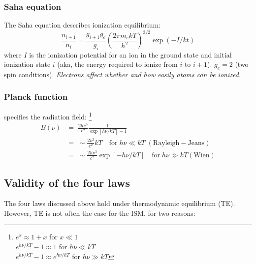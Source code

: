 \documentclass[11pt]{article}
\newcommand{\mar}[1]{\hspace{0pt}\marginpar{-\textcolor{black}{#1}-}}
\newcommand{\mynotes}[1]{{\fontfamily{cmss}\selectfont \textit{#1}}}
\begin{document}
\subsubsection{Saha equation}
The Saha equation describes ionization equilibrium:
\[
    \frac{n_{i+1}}{n_{i}} = \frac{g_{i+1}g_{e}}{g_{i}}
    \left( \frac{2\pi m_{e}kT}{h^{2}} \right) ^{3/2}
    \exp \left( -I/kt \right)
    \]
where $I$ is the ionization potential for an ion in the ground state
and initial ionization state $i$ (aka, the energy required to ionize
from $i$ to $i+1$). $g_{e} = 2$ (two spin conditions).
\mynotes{Electrons affect whether and how easily atoms can be ionized.}

\subsubsection{Planck function} specifies the radiation field:
\footnote{
    $e^{x} \approx 1 + x$ for $x \ll 1$\\
    $e^{h\nu/kT}-1 \approx 1$ for $h\nu \ll kT$\\
    $e^{h\nu/kT}-1 \approx e^{h\nu/kT}$ for $h\nu \gg kT$}
\begin{align*}
    B(\nu) &= \;\frac{2h\nu^{3}}{c^{2}}\frac{1}{\exp[h\nu/kT]-1}\\
    &= \;\sim \frac{2\nu^{2}}{c^{2}}kT\quad \mathrm{for}\;h\nu \ll kT\;
    (\mathrm{Rayleigh-Jeans})\\
    &= \;\sim \frac{2h\nu^{3}}{c^{2}}\exp[-h\nu/kT]\quad\mathrm{for}\;h\nu \gg kT
    (\mathrm{Wien})
\end{align*}

\subsection{Validity of the four laws}
\mar{19}The four laws discussed above hold under thermodynamic equilibrium
(TE). However, TE is not often the case for the ISM, for two reasons:
\end{document}
